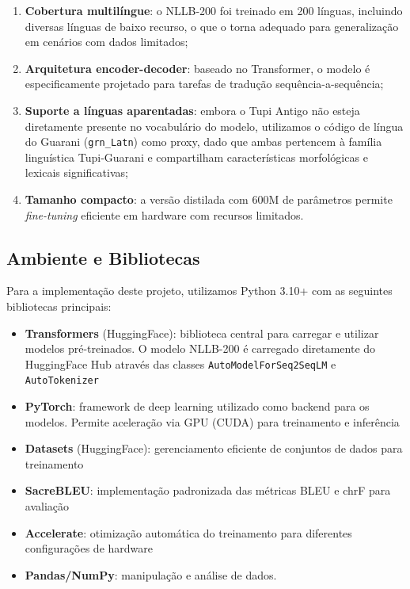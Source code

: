 \documentclass[12pt,a4paper]{article}
\begin{document}
\begin{enumerate}
    \item \textbf{Cobertura multilíngue}: o NLLB-200 foi treinado em 200 línguas, incluindo diversas línguas de baixo recurso, o que o torna adequado para generalização em cenários com dados limitados;
    
    \item \textbf{Arquitetura encoder-decoder}: baseado no Transformer, o modelo é especificamente projetado para tarefas de tradução sequência-a-sequência;
    
    \item \textbf{Suporte a línguas aparentadas}: embora o Tupi Antigo não esteja diretamente presente no vocabulário do modelo, utilizamos o código de língua do Guarani (\texttt{grn\_Latn}) como proxy, dado que ambas pertencem à família linguística Tupi-Guarani e compartilham características morfológicas e lexicais significativas;
    
    \item \textbf{Tamanho compacto}: a versão distilada com 600M de parâmetros permite \textit{fine-tuning} eficiente em hardware com recursos limitados.
\end{enumerate}

\subsection{Ambiente e Bibliotecas}

Para a implementação deste projeto, utilizamos Python 3.10+ com as seguintes bibliotecas principais:

\begin{itemize}
    \item \textbf{Transformers} (HuggingFace): biblioteca central para carregar e utilizar modelos pré-treinados. O modelo NLLB-200 é carregado diretamente do HuggingFace Hub através das classes \texttt{AutoModelForSeq2SeqLM} e \texttt{AutoTokenizer}
    
    \item \textbf{PyTorch}: framework de deep learning utilizado como backend para os modelos. Permite aceleração via GPU (CUDA) para treinamento e inferência
    
    \item \textbf{Datasets} (HuggingFace): gerenciamento eficiente de conjuntos de dados para treinamento
    
    \item \textbf{SacreBLEU}: implementação padronizada das métricas BLEU e chrF para avaliação
    
    \item \textbf{Accelerate}: otimização automática do treinamento para diferentes configurações de hardware
    
    \item \textbf{Pandas/NumPy}: manipulação e análise de dados.
\end{itemize}
\end{document}
